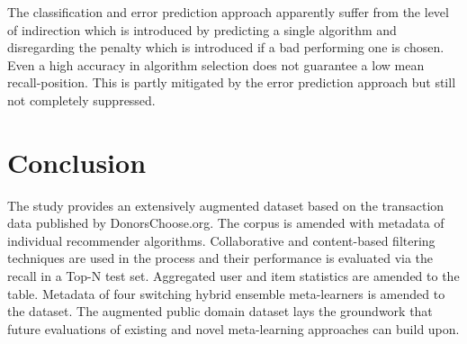 \documentclass[runningheads]{llncs}
\begin{document}
The classification and error prediction approach apparently suffer from the level of indirection which is introduced by predicting a single algorithm and disregarding the penalty which is introduced if a bad performing one is chosen. Even a high accuracy in algorithm selection does not guarantee a low mean recall-position. This is partly mitigated by the error prediction approach but still not completely suppressed.

\section{Conclusion}
The study provides an extensively augmented dataset based on the transaction data published by DonorsChoose.org. The corpus is amended with metadata of individual recommender algorithms. Collaborative and content-based filtering techniques are used in the process and their performance is evaluated via the recall in a Top-N test set. Aggregated user and item statistics are amended to the table. Metadata of four switching hybrid ensemble meta-learners is amended to the dataset. The augmented public domain dataset lays the groundwork that future evaluations of existing and novel meta-learning approaches can build upon.

\begin{appendix}
	\printbibliography[heading=bibintoc]
\end{appendix}
\end{document}
